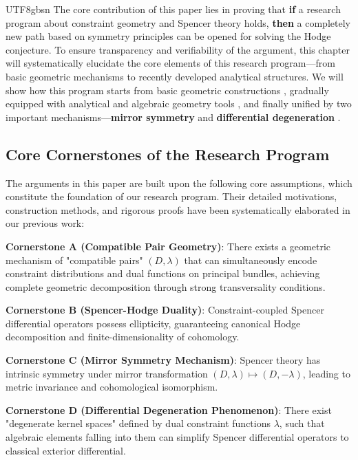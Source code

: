 \documentclass[a4paper,12pt]{extarticle}
\theoremstyle{definition}
\begin{document}
\begin{CJK}{UTF8}{gbsn}
The core contribution of this paper lies in proving that \textbf{if} a research program about constraint geometry and Spencer theory holds, \textbf{then} a completely new path based on symmetry principles can be opened for solving the Hodge conjecture. To ensure transparency and verifiability of the argument, this chapter will systematically elucidate the core elements of this research program—from basic geometric mechanisms to recently developed analytical structures. We will show how this program starts from basic geometric constructions \cite{zheng2025dynamical}, gradually equipped with analytical and algebraic geometry tools \cite{zheng2025constructing, zheng2025spencer-riemann-roch}, and finally unified by two important mechanisms—\textbf{mirror symmetry} \cite{zheng2025mirror} and \textbf{differential degeneration} \cite{zheng2025spencerdifferentialdegenerationtheory}.

\subsection{Core Cornerstones of the Research Program}
The arguments in this paper are built upon the following core assumptions, which constitute the foundation of our research program. Their detailed motivations, construction methods, and rigorous proofs have been systematically elaborated in our previous work\cite{zheng2025dynamical,zheng2025extend,zheng2025constructing,zheng2025mirror,zheng2025spencerdifferentialdegenerationtheory,zheng2025spencer-riemann-roch}:

\textbf{Cornerstone A (Compatible Pair Geometry)}: There exists a geometric mechanism of "compatible pairs" $(D,\lambda)$ that can simultaneously encode constraint distributions and dual functions on principal bundles, achieving complete geometric decomposition through strong transversality conditions.

\textbf{Cornerstone B (Spencer-Hodge Duality)}: Constraint-coupled Spencer differential operators possess ellipticity, guaranteeing canonical Hodge decomposition and finite-dimensionality of cohomology.

\textbf{Cornerstone C (Mirror Symmetry Mechanism)}: Spencer theory has intrinsic symmetry under mirror transformation $(D,\lambda) \mapsto (D,-\lambda)$, leading to metric invariance and cohomological isomorphism.

\textbf{Cornerstone D (Differential Degeneration Phenomenon)}: There exist "degenerate kernel spaces" defined by dual constraint functions $\lambda$, such that algebraic elements falling into them can simplify Spencer differential operators to classical exterior differential.


\end{CJK}
\end{document}
